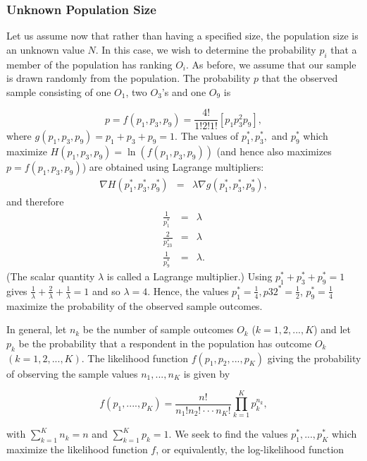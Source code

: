 \documentclass[a4paper, 12pt]{article}
\begin{document}
\subsubsection{Unknown Population Size}


Let us assume now that rather than having a specified size, the population size is an unknown value $N$.  In this case, we wish to determine the probability $p_i$  that a member of the population has ranking $O_i$.  As before, we assume that our sample is drawn randomly from the population. The probability $p$ that the observed sample consisting of one $O_1$, two $O_3$'s and one $O_9$ is

\begin{equation}
p=f(p_1,p_3,p_9)=\frac{4!}{1!2!1!}[p_1p_3^2p_9],
\end{equation}
\label{eq:1}
{\flushleft where} $g(p_1,p_3,p_9)=p_1+p_3+p_9=1$.
The values of $p_1^*,p_3^*,$ and $p_9^*$ which maximize $H(p_1,p_3,p_9)=\ln (f(p_1,p_3,p_9))$ (and hence also maximizes $p=f(p_1,p_3,p_9)$)  are obtained using Lagrange multipliers:
\begin{eqnarray*}
	\nabla H(p_1^*,p_3^*,p_9^*) & = & \lambda \nabla g
	(p_1^*,p_3^*,p_9^*),
\end{eqnarray*}
{\flushleft and therefore}
\begin{eqnarray*}
	\frac{1}{p_1^*} & = & \lambda\\
	\frac{2}{p_23^*} & = & \lambda\\
	\frac{1}{p_9^*} & = & \lambda.
\end{eqnarray*}
{\flushleft (The scalar quantity $\lambda$ is called a Lagrange multiplier.) Using} $p_1^*+p_3^*+p_9^*=1$ gives $\frac{1}{\lambda} + \frac{2}{\lambda}+\frac{1}{\lambda}=1$ and so $ \lambda = 4$.  Hence, the values $p_1^*=\frac{1}{4}, p32^*=\frac{1}{2}$, $p_9^*=\frac{1}{4}$ maximize the probability of the observed sample outcomes.  

In general, let $n_k$ be the number of sample outcomes $O_k$ ($k=1,2,...,K$) and let $p_k$ be the probability that a respondent in the population  has outcome $O_k$ $(k= 1, 2, ..., K)$.  The likelihood function $f(p_1, p_2, ..., p_K)$ giving the probability of observing the sample values $n_1, ..., n_{K}$ is given by

\begin{equation}
f(p_1, ...., p_K)= \frac{n!}{n_1!n_2!\cdot\cdot\cdot n_K!} \prod_{k=1}^K p_k^{n_k},
\end{equation}
\label{eq:4}

{\flushleft with} $\sum_{k=1}^{K}n_k=n$ and $\sum_{k=1}^{K}p_k=1$.
We seek to find the values $p_1^*, ..., p_{K}^*$ which maximize the likelihood function $f$, or equivalently, the log-likelihood function
\end{document}
